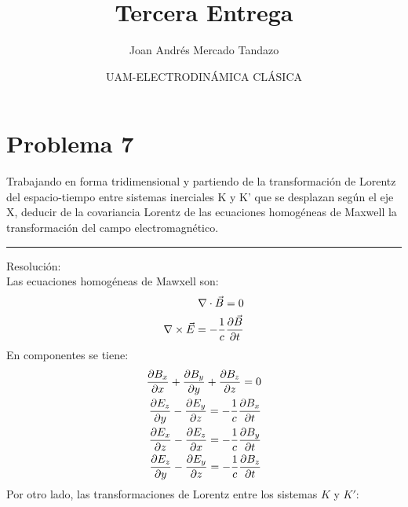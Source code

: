 \documentclass[11pt]{article}
\author{\Large Joan Andrés Mercado Tandazo}
\date{\Large UAM-ELECTRODINÁMICA CLÁSICA}
\title{\huge \textbf{Tercera Entrega}}
\begin{document}
\maketitle
\brightmode
\section*{Problema 7}
Trabajando en forma tridimensional y partiendo de la transformación
de Lorentz del espacio-tiempo entre sistemas inerciales K y K' que
se desplazan según el eje X, deducir de la covariancia Lorentz de las
ecuaciones homogéneas de Maxwell la transformación del campo electromagnético.
\vspace*{1em}
\hrule
\vspace*{1em}
{\color{blue} Resolución:}\\
Las ecuaciones homogéneas de Mawxell son: 
\begin{eqnarray}
    \nabla \cdot \vec{B} = 0\\
    \nabla \times \vec{E} = -\dfrac{1}{c}\pdv{\vec{B}}{t}
\end{eqnarray}
En componentes se tiene: 
\begin{eqnarray}
    \pdv{B_x}{x} + \pdv{B_y}{y} + \pdv{B_z}{z} = 0\label{Gauss-K}\\
    \pdv{E_z}{y} - \pdv{E_y}{z} = -\dfrac{1}{c}\pdv{B_x}{t}\label{Faraday-1-K}\\
    \pdv{E_x}{z} - \pdv{E_z}{x} = -\dfrac{1}{c}\pdv{B_y}{t}\label{Faraday-2-K}\\
    \pdv{E_z}{y} - \pdv{E_y}{z} = -\dfrac{1}{c}\pdv{B_z}{t}\label{Faraday-3-K}
\end{eqnarray}    
Por otro lado, las transformaciones de Lorentz entre los sistemas $K$ y $K'$: 
\end{document}
